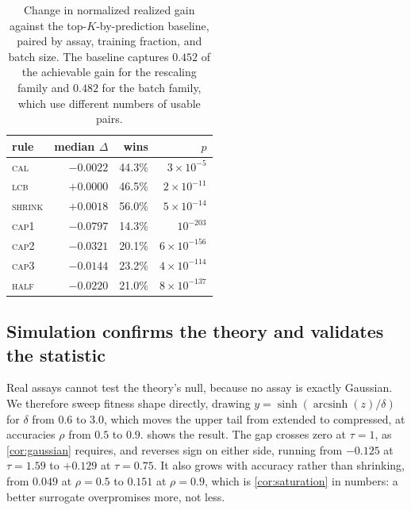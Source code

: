 \documentclass{article}
\theoremstyle{plain}
\theoremstyle{definition}
\begin{document}
\begin{table}[t]
\caption{Change in normalized realized gain against the top-$K$-by-prediction baseline,
paired by assay, training fraction, and batch size. The baseline captures $0.452$ of
the achievable gain for the rescaling family and $0.482$ for the batch family, which
use different numbers of usable pairs.}
\label{tab:fix}
\vskip 0.1in
\begin{center}
\begin{small}
\begin{tabular}{lrrr}
\toprule
rule & median $\Delta$ & wins & $p$ \\
\midrule
\textsc{cal}    & $-0.0022$ & 44.3\% & $3{\times}10^{-5}$ \\
\textsc{lcb}    & $+0.0000$ & 46.5\% & $2{\times}10^{-11}$ \\
\textsc{shrink} & $+0.0018$ & 56.0\% & $5{\times}10^{-14}$ \\
\midrule
\textsc{cap}1   & $-0.0797$ & 14.3\% & $10^{-203}$ \\
\textsc{cap}2   & $-0.0321$ & 20.1\% & $6{\times}10^{-156}$ \\
\textsc{cap}3   & $-0.0144$ & 23.2\% & $4{\times}10^{-114}$ \\
\textsc{half}   & $-0.0220$ & 21.0\% & $8{\times}10^{-137}$ \\
\bottomrule
\end{tabular}
\end{small}
\end{center}
\vskip -0.1in
\end{table}

\subsection{Simulation confirms the theory and validates the statistic}
\label{sec:results-synth}

Real assays cannot test the theory's null, because no assay is exactly Gaussian. We
therefore sweep fitness shape directly, drawing $y = \sinh(\operatorname{arcsinh}(z) /
\delta)$ for $\delta$ from $0.6$ to $3.0$, which moves the upper tail from extended to
compressed, at accuracies $\rho$ from $0.5$ to $0.9$.  shows the
result. The gap crosses zero at $\tau = 1$, as \cref{cor:gaussian} requires, and
reverses sign on either side, running from $-0.125$ at $\tau = 1.59$ to $+0.129$ at
$\tau = 0.75$. It also grows with accuracy rather than shrinking, from $0.049$ at
$\rho = 0.5$ to $0.151$ at $\rho = 0.9$, which is \cref{cor:saturation} in numbers:
a better surrogate overpromises more, not less.
\end{document}
